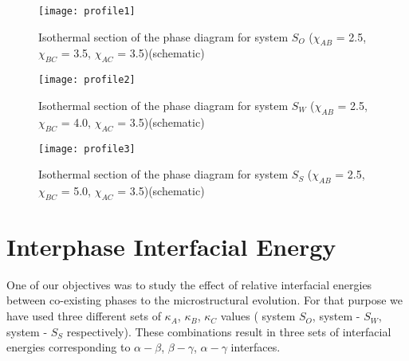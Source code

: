 \documentclass[12pt]{iiscthes}
\theoremstyle{definition}
\theoremstyle{definition}
\theoremstyle{remark}
\begin{document}
\begin{figure}[H]
\begin{center}
\texttt{[image: profile1]}
\caption{Isothermal section of the phase diagram for system $S_O$ ($\chi_{AB}$ = 2.5, $\chi_{BC}$ = 3.5, $\chi_{AC}$ = 3.5)(schematic)}
\label{profile1}
\end{center}
\end{figure}
\begin{figure}[H]
\begin{center}
\texttt{[image: profile2]}
\caption{Isothermal section of the phase diagram for system $S_W$ ($\chi_{AB}$ = 2.5, $\chi_{BC}$ = 4.0, $\chi_{AC}$ = 3.5)(schematic)}
\label{profile2}
\end{center}
\end{figure}
\begin{figure}[H]
\begin{center}
\texttt{[image: profile3]}
\caption{Isothermal section of the phase diagram for system $S_S$ ($\chi_{AB}$ = 2.5, $\chi_{BC}$ = 5.0, $\chi_{AC}$ = 3.5)(schematic)}
\label{profile3}
\end{center}
\end{figure}

\section{Interphase Interfacial Energy}\label{iie}
One of our objectives was to study the effect of relative interfacial energies between co-existing phases to the microstructural evolution. For that purpose we have used three different sets of $\kappa_A$, $\kappa_B$, $\kappa_C$ values ( system $S_O$, system - $S_W$, system - $S_S$ respectively). These combinations result in three sets of interfacial energies corresponding to $\alpha - \beta$, $\beta - \gamma$, $\alpha - \gamma$ interfaces.
\end{document}
